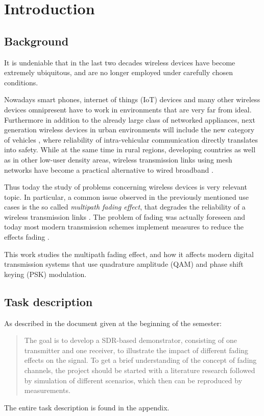 
\chapter{Introduction} \label{chp:introduction}

\section{Background}

It is undeniable that in the last two decades wireless devices have become extremely ubiquitous, and are no longer employed under carefully chosen conditions.

Nowadays smart phones, internet of things (IoT) devices and many other wireless devices omnipresent have to work in environments that are very far from ideal. Furthermore in addition to the already large class of networked appliances, next generation wireless devices in urban environments will include the new category of vehicles \cite{AntonescuTB17}, where reliability of intra-vehicular communication directly translates into safety. While at the same time in rural regions, developing countries as well as in other low-user density areas, wireless transmission links using mesh networks have become a practical alternative to wired broadband \cite{Macmillan2019tidal,Subramanian2006rethinking,Flickenger2007wireless}.

Thus today the study of problems concerning wireless devices is very relevant topic. In particular, a common issue observed in the previously mentioned use cases is the so called \emph{multipath fading effect}, that degrades the reliability of a wireless transmission links \cite{Mathis, Gallager}. The problem of fading was actually foreseen \cite{Frederiksen2002overview,Maddocks1993introduction} and today most modern transmission schemes implement measures to reduce the effects fading \cite{Mathis,Hsu}.

This work studies the multipath fading effect, and how it affects modern digital transmission systems that use quadrature amplitude (QAM) and phase shift keying (PSK) modulation.

\section{Task description}

As described in the document given at the beginning of the semester:
\begin{quote}
	The goal is to develop a SDR-based demonstrator, consisting of one transmitter and one receiver, to illustrate the impact of different fading effects on the signal. To get a brief understanding of the concept of fading channels, the project should be started with a literature research followed by simulation of different scenarios, which then can be reproduced by measurements.
\end{quote}
The entire task description is found in the appendix.

